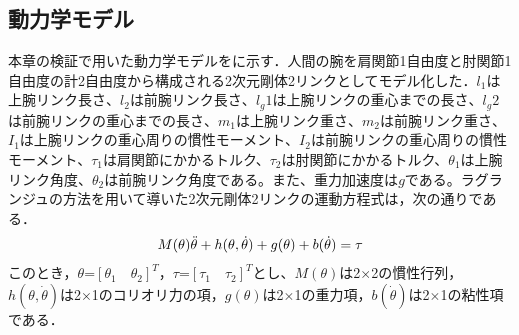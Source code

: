 \begin{small}
\subsection{動力学モデル}
本章の検証で用いた動力学モデルをに示す．人間の腕を肩関節1自由度と肘関節1自由度の計2自由度から構成される2次元剛体2リンクとしてモデル化した．$l_{1}$は上腕リンク長さ、$l_{2}$は前腕リンク長さ、$l_g{1}$は上腕リンクの重心までの長さ、$l_g{2}$は前腕リンクの重心までの長さ、$m_{1}$は上腕リンク重さ、$m_{2}$は前腕リンク重さ、$I_{1}$は上腕リンクの重心周りの慣性モーメント、$I_{2}$は前腕リンクの重心周りの慣性モーメント、$\tau_{1}$は肩関節にかかるトルク、$\tau_{2}$は肘関節にかかるトルク、$\theta_{1}$は上腕リンク角度、$\theta_{2}$は前腕リンク角度である。また、重力加速度は$g$である。ラグランジュの方法を用いて導いた2次元剛体2リンクの運動方程式は，次の通りである．
\begin{eqnarray}
  \equlabel{5}
  M(\theta)\ddot{\theta} + h(\theta, \dot{\theta}) + g(\theta) + b(\dot{\theta}) = \tau
\end{eqnarray}
このとき，$\theta$=${[\theta_{1} \quad \theta_{2}]}^T$，$\tau$=${[\tau_{1} \quad \tau_{2}]}^T$とし、$M(\theta)$は2$\times$2の慣性行列，$h(\theta, \dot{\theta})$は2$\times$1のコリオリ力の項，$g(\theta)$は2$\times$1の重力項，$b(\dot{\theta})$は2$\times$1の粘性項である．


\end{small}
